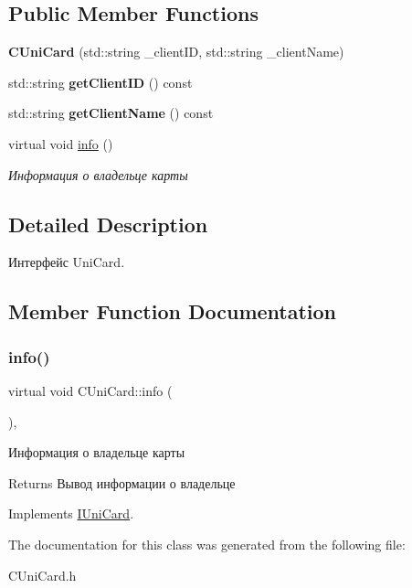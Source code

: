 \subsection*{Public Member Functions}
\begin{DoxyCompactItemize}
\item 
\mbox{\label{classCUniCard_a572470efc8f60cb742347ac1899e5e0f}} 
{\bfseries C\+Uni\+Card} (std\+::string \+\_\+client\+ID, std\+::string \+\_\+client\+Name)
\item 
\mbox{\label{classCUniCard_a27e7269800748f3dadeaecef60d0d6c3}} 
std\+::string {\bfseries get\+Client\+ID} () const
\item 
\mbox{\label{classCUniCard_aecbc839e2f73e8fac5f1c0216d4ac7bf}} 
std\+::string {\bfseries get\+Client\+Name} () const
\item 
virtual void \hyperlink{classCUniCard_ae9fe7cef81ddff409a20b1aeddb45fa9}{info} ()
\begin{DoxyCompactList}\small\item\em Информация о владельце карты \end{DoxyCompactList}\end{DoxyCompactItemize}


\subsection{Detailed Description}
Интерфейс Uni\+Card. 

\subsection{Member Function Documentation}
\mbox{\label{classCUniCard_ae9fe7cef81ddff409a20b1aeddb45fa9}} 
\subsubsection{\texorpdfstring{info()}{info()}}
{\footnotesize\ttfamily virtual void C\+Uni\+Card\+::info (\begin{DoxyParamCaption}{ }\end{DoxyParamCaption})\hspace{0.3cm}{\ttfamily [inline]}, {\ttfamily [virtual]}}



Информация о владельце карты 

\begin{DoxyReturn}{Returns}
Вывод информации о владельце 
\end{DoxyReturn}


Implements \hyperlink{classIUniCard}{I\+Uni\+Card}.



The documentation for this class was generated from the following file\+:\begin{DoxyCompactItemize}
\item 
C\+Uni\+Card.\+h\end{DoxyCompactItemize}
